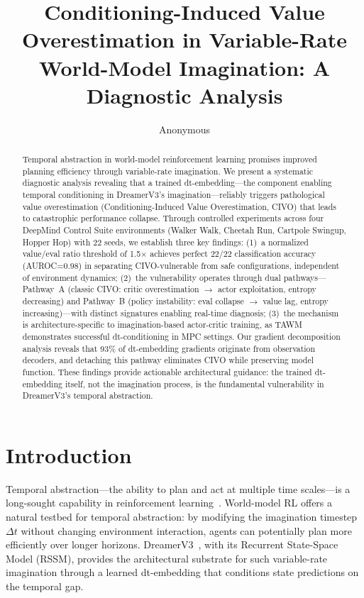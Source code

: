 \documentclass[10pt,letterpaper]{article}
\title{Conditioning-Induced Value Overestimation in Variable-Rate\\World-Model Imagination: A Diagnostic Analysis}
\author{Anonymous}
\date{}
\begin{document}
\maketitle

\begin{abstract}
Temporal abstraction in world-model reinforcement learning promises improved planning efficiency through variable-rate imagination. We present a systematic diagnostic analysis revealing that a trained dt-embedding---the component enabling temporal conditioning in DreamerV3's imagination---reliably triggers pathological value overestimation (Conditioning-Induced Value Overestimation, CIVO) that leads to catastrophic performance collapse. Through controlled experiments across four DeepMind Control Suite environments (Walker Walk, Cheetah Run, Cartpole Swingup, Hopper Hop) with 22 seeds, we establish three key findings: (1)~a normalized value/eval ratio threshold of 1.5$\times$ achieves perfect 22/22 classification accuracy (AUROC=0.98) in separating CIVO-vulnerable from safe configurations, independent of environment dynamics; (2)~the vulnerability operates through dual pathways---Pathway~A (classic CIVO: critic overestimation $\to$ actor exploitation, entropy decreasing) and Pathway~B (policy instability: eval collapse $\to$ value lag, entropy increasing)---with distinct signatures enabling real-time diagnosis; (3)~the mechanism is architecture-specific to imagination-based actor-critic training, as TAWM demonstrates successful dt-conditioning in MPC settings. Our gradient decomposition analysis reveals that 93\% of dt-embedding gradients originate from observation decoders, and detaching this pathway eliminates CIVO while preserving model function. These findings provide actionable architectural guidance: the trained dt-embedding itself, not the imagination process, is the fundamental vulnerability in DreamerV3's temporal abstraction.
\end{abstract}

\section{Introduction}

Temporal abstraction---the ability to plan and act at multiple time scales---is a long-sought capability in reinforcement learning~\cite{sutton1999options,vezhnevets2017feudal}. World-model RL offers a natural testbed for temporal abstraction: by modifying the imagination timestep $\Delta t$ without changing environment interaction, agents can potentially plan more efficiently over longer horizons. DreamerV3~\cite{hafner2023dreamerv3}, with its Recurrent State-Space Model (RSSM), provides the architectural substrate for such variable-rate imagination through a learned dt-embedding that conditions state predictions on the temporal gap.
\end{document}
